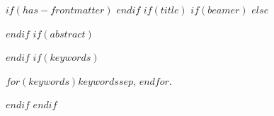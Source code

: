 $if(has-frontmatter)$
\frontmatter
$endif$
$if(title)$
$if(beamer)$
\frame{\titlepage}
$else$
\maketitle
$endif$
$if(abstract)$
\begin{abstract}
$abstract$
\end{abstract}
$endif$
$if(keywords)$
\begin{IEEEkeywords}$for(keywords)$$keywords$$sep$, $endfor$.\end{IEEEkeywords}
$endif$
$endif$
